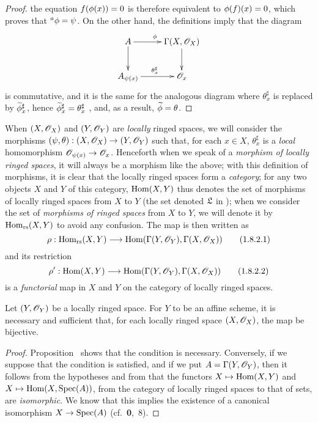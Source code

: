 \begin{proof}
the equation $f(\phi(x))=0$ is therefore equivalent to $\phi(f)(x)=0$, which proves that ${}^a\phi=\psi$.
On the other hand, the definitions imply that the diagram
\[
  \xymatrix{
    A\ar[r]^\vphi\ar[d] &
    \Gamma(X,\OO_X)\ar[d]\\
    A_{\psi(x)}\ar[r]^{\theta_x^\sharp} &
    \OO_x
  }
\]
is commutative, and it is the same for the analogous diagram where $\theta_x^\sharp$ is replaced by ${\widetilde{\phi}}_x^\sharp$, hence ${\widetilde{\phi}}_x^\sharp=\theta_x^\sharp$ , and, as a result, ${\widetilde{\phi}}=\theta$.
\end{proof}

\begin{env}[1.8.2]
\label{1.1.8.2}
When $(X,\mathscr{O}_X)$ and $(Y,\mathscr{O}_Y)$ are \emph{locally} ringed spaces, we will consider the morphisms $(\psi,\theta):(X,\OO_X)\to(Y,\OO_Y)$ such that, for each $x\in X$, $\theta_x^\sharp$ is a \emph{local} homomorphism $\OO_{\psi(x)}\to\OO_x$.
Henceforth when we speak
of a \emph{morphism of locally ringed spaces}, it will always be a morphism like the above;
with this definition of morphisms, it is clear that the locally ringed spaces form a \emph{category};
for any two objects $X$ and $Y$ of this category, ${\mathop{\mathrm{Hom}}\nolimits}(X,Y)$ thus denotes the set of morphisms of locally ringed spaces from $X$ to $Y$ (the set denoted $\mathfrak{L}$ in );
when we consider the set of \emph{morphisms of ringed spaces} from $X$ to $Y$, we will denote it by ${\mathop{\mathrm{Hom}}\nolimits}_\text{rs}(X,Y)$ to avoid any confusion.
The map  is then written as
\begin{equation*}
  \label{1.1.8.2.1}
  \rho:\Hom_\text{rs}(X,Y)\to\Hom(\Gamma(Y,\OO_Y),\Gamma(X,\OO_X))
  \tag{1.8.2.1}
\end{equation*}
and its restriction
\begin{equation*}
  \label{1.1.8.2.2}
  \rho':\Hom(X,Y)\to\Hom(\Gamma(Y,\OO_Y),\Gamma(X,\OO_X))
  \tag{1.8.2.2}
\end{equation*}
is a \emph{functorial} map in $X$ and $Y$ on the category of locally ringed spaces.
\end{env}

\begin{cor}[1.8.3]
\label{1.1.8.3}
Let $(Y,\mathscr{O}_Y)$ be a locally ringed space.
For $Y$ to be an affine scheme, it is necessary and sufficient that, for each locally ringed space $(X,\mathscr{O}_X)$, the map  be bijective.
\end{cor}

\begin{proof}
\label{proof-1.1.8.3}
Proposition~ shows that the condition is necessary.
Conversely, if we suppose that the condition is satisfied, and if we put $A=\Gamma(Y,\mathscr{O}_Y)$, then it follows from the hypotheses and from  that the functors $X\mapsto\Hom(X,Y)$ and $X\mapsto\Hom(X,\Spec(A))$, from the category of locally ringed spaces to that of sets, are \emph{isomorphic}.
We know that this implies the existence of a canonical isomorphism $X\to\Spec(A)$ (cf.~\textbf{0},~8).
\end{proof}

